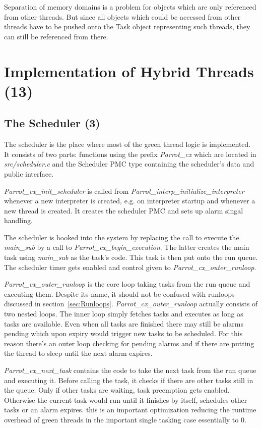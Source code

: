 \documentclass[bachelor,english]{hgbthesis}
\begin{document}
Separation of memory domains is a problem for objects which are only referenced from other threads. But since all objects which could be accessed from other threads have to be pushed onto the Task object representing such threads, they can still be referenced from there.

\chapter{Implementation of Hybrid Threads (13)}

\section{The Scheduler (3)}

The scheduler is the place where most of the green thread logic is implemented. It consists of two parts: functions using the prefix \textit{Parrot\_cx} which are located in \textit{src/scheduler.c} and the Scheduler PMC type containing the scheduler's data and public interface.

\textit{Parrot\_cx\_init\_scheduler} is called from \textit{Parrot\_interp\_initialize\_interpreter} whenever a new interpreter is created, e.g. on interpreter startup and whenever a new thread is created. It creates the scheduler PMC and sets up alarm singal handling.

The scheduler is hooked into the system by replacing the call to execute the \textit{main\_sub} by a call to \textit{Parrot\_cx\_begin\_execution}. The latter creates the main task using \textit{main\_sub} as the task's code. This task is then put onto the run queue. The scheduler timer gets enabled and control given to \textit{Parrot\_cx\_outer\_runloop}.

\textit{Parrot\_cx\_outer\_runloop} is the core loop taking tasks from the run queue and executing them. Despite its name, it should not be confused with runloops discussed in section~\ref{sec:Runloops}. \textit{Parrot\_cx\_outer\_runloop} actually consists of two nested loops. The inner loop simply fetches tasks and executes as long as tasks are available. Even when all tasks are finished there may still be alarms pending which upon expiry would trigger new tasks to be scheduled. For this reason there's an outer loop checking for pending alarms and if there are putting the thread to sleep until the next alarm expires.

\textit{Parrot\_cx\_next\_task} contains the code to take the next task from the run queue and executing it. Before calling the task, it checks if there are other tasks still in the queue. Only if other tasks are waiting, task preemption gets enabled. Otherwise the current task would run until it finishes by itself, schedules other tasks or an alarm expires. this is an important optimization reducing the runtime overhead of green threads in the important single tasking case essentially to 0.
\end{document}
